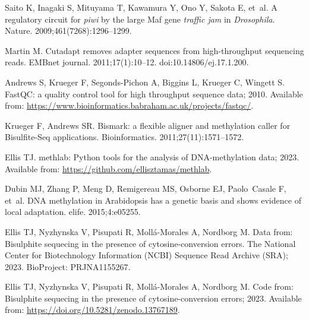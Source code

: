 \documentclass[10pt,letterpaper]{article}
\begin{document}
\begin{thebibliography}{10}
Saito K, Inagaki S, Mituyama T, Kawamura Y, Ono Y, Sakota E, et~al.
\newblock A regulatory circuit for \textit{piwi} by the large Maf gene \textit{traffic jam} in \textit{Drosophila}.
\newblock Nature. 2009;461(7268):1296--1299.

Martin M.
\newblock Cutadapt removes adapter sequences from high-throughput sequencing reads.
\newblock EMBnet journal. 2011;17(1):10--12.
\newblock doi:{10.14806/ej.17.1.200}.

Andrews S, Krueger F, Segonds-Pichon A, Biggins L, Krueger C, Wingett S. FastQC: a quality control tool for high throughput sequence data; 2010.
\newblock Available from: \url{https://www.bioinformatics.babraham.ac.uk/projects/fastqc/}.

Krueger F, Andrews SR.
\newblock Bismark: a flexible aligner and methylation caller for Bisulfite-Seq applications.
\newblock Bioinformatics. 2011;27(11):1571--1572.

Ellis TJ. methlab: Python tools for the analysis of DNA-methylation data; 2023.
\newblock Available from: \url{https://github.com/ellisztamas/methlab}.

Dubin MJ, Zhang P, Meng D, Remigereau MS, Osborne EJ, Paolo~Casale F, et~al.
\newblock DNA methylation in Arabidopsis has a genetic basis and shows evidence of local adaptation.
\newblock elife. 2015;4:e05255.

Ellis TJ, Nyzhynska V, Pisupati R, Moll\'a-Morales A, Nordborg M.
\newblock Data from: Bisulphite sequecing in the presence of cytosine-conversion errors.
\newblock The National Center for Biotechnology Information (NCBI) Sequence Read Archive (SRA); 2023. BioProject: PRJNA1155267.

Ellis TJ, Nyzhynska V, Pisupati R, Moll\'a-Morales A, Nordborg M. Code from: Bisulphite sequecing in the presence of cytosine-conversion errors; 2023.
\newblock Available from: \url{https://doi.org/10.5281/zenodo.13767189}.

\end{thebibliography}
\end{document}
